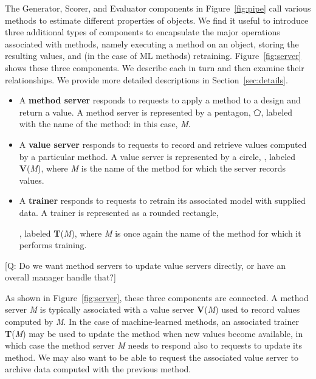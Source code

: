 \documentclass[10pt]{article}
\newcommand\q[1]{{\color{blue}[Q: #1]}}
\begin{document}
The Generator, Scorer, and Evaluator components in Figure~\ref{fig:pipe} call various methods to estimate different properties of objects.
We find it useful to introduce three additional types of components to encapsulate the major operations associated with methods,
namely executing a method on an object, storing the resulting values, and (in the case of ML methods) retraining.  
Figure~\ref{fig:server} shows these three components. 
We describe each in turn and then examine their relationships.
We provide more detailed descriptions in Section~\ref{sec:details}.



\begin{itemize}
\itemsep-0.3em 
\item
A \textbf{method server} responds to requests to apply a method to a design and return a value. 
A method server is represented by a pentagon, $\pentagon$, labeled with the name of the method: in this case, \emph{M}. 
\item
A \textbf{value server} responds to requests to record and retrieve values computed by a particular method.
A value server is represented by a circle, \textbigcircle,
labeled \textbf{V}(\emph{M}), where \emph{M} is the name of the method for which the server records values.
\item
A \textbf{trainer} responds to requests to retrain its associated model with supplied data.
A trainer is represented as a rounded rectangle, , labeled \textbf{T}(\emph{M}),
where \emph{M} is once again the name of the method for which it performs training.
\end{itemize}

\q{Do we want method servers to update value servers directly, or have an overall manager handle that?}



As shown in Figure~\ref{fig:server}, these three components are connected. 
A method server \emph{M} is typically associated with a value server \textbf{V}(\emph{M}) used to record values computed by \emph{M}.
In the case of machine-learned methods, an associated trainer \textbf{T}(\emph{M}) may be used to update the method when new values become available,
in which case the method server \emph{M} needs to respond also to requests to update its method.
We may also want to be able to request the associated value server to archive data computed with the previous method.
\end{document}
